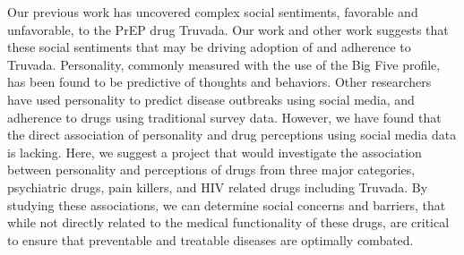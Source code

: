 Our previous work has uncovered complex social sentiments, favorable and unfavorable, to the PrEP drug Truvada. Our work and other work suggests that these social sentiments that may be driving adoption of and adherence to Truvada. Personality, commonly measured with the use of the Big Five profile, has been found to be predictive of thoughts and behaviors. Other researchers have used personality to predict disease outbreaks using social media, and adherence to drugs using traditional survey data. However, we have found that the direct association of personality and drug perceptions using social media data is lacking. Here, we suggest a project that would investigate the association between personality and perceptions of drugs from three major categories, psychiatric drugs, pain killers, and HIV related drugs including Truvada. By studying these associations, we can determine social concerns and barriers, that while not directly related to the medical functionality of these drugs, are  critical to ensure that preventable and treatable diseases are optimally combated.
